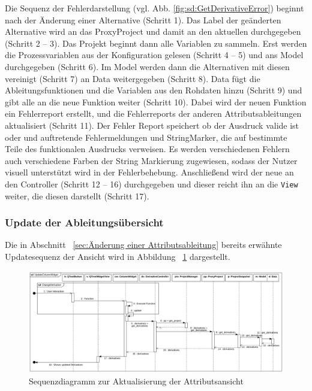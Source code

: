 \documentclass{article}
\newcommand{\classref}[1]{\texttt{\nameref{cls:#1}}}
\begin{document}
Die Sequenz der Fehlerdarstellung (vgl. Abb. \ref{fig:sd:GetDerivativeError}) beginnt nach der Änderung einer Alternative (Schritt 1). Das Label der geänderten Alternative wird an das ProxyProject und damit an den aktuellen \classref{ProjectSnaphot} durchgegeben (Schritt 2 -- 3). Das Projekt beginnt dann alle Variablen zu sammeln. Erst werden die Prozessvariablen aus der Konfiguration gelesen (Schritt 4 -- 5) und ans Model durchgegeben (Schritt 6). Im Model werden dann die Alternativen mit diesen vereinigt (Schritt 7) an Data weitergegeben (Schritt 8). Data fügt die Ableitungsfunktionen und die Variablen aus den Rohdaten hinzu (Schritt 9) und gibt alle an die neue Funktion weiter (Schritt 10). Dabei wird der neuen Funktion ein Fehlerreport erstellt, und die Fehlerreports der anderen Attributsableitungen aktualisiert (Schritt 11). Der Fehler Report speichert ob der Ausdruck valide ist oder und auftretende Fehlermeldungen und StringMarker, die auf bestimmte Teile des funktionalen Ausdrucks verweisen. Es werden verschiedenen Fehlern auch verschiedene Farben der String Markierung zugewiesen, sodass der Nutzer visuell unterstützt wird in der Fehlerbehebung. Anschließend wird der neue \classref{ErrorReport} an den Controller (Schritt 12 -- 16) durchgegeben und dieser reicht ihn an die \texttt{View} weiter, die diesen darstellt (Schritt 17).

\subsubsection{Update der Ableitungsübersicht}\label{sec:Update der Ableitungsübersicht}
Die in Abschnitt ~\ref{sec:Änderung einer Attributsableitung} bereits erwähnte Updatesequenz der Ansicht wird in Abbildung ~\ref{fig:sd:UpdateColumnWidgetSequenceDiagram} dargestellt.

\begin{figure}[H]%
    \centering
    \includegraphics[width=13cm]{entwurf/Floriane/UpdateColumnWidget.png}
    \caption{Sequenzdiagramm zur Aktualisierung der Attributsansicht}
    \label{fig:sd:UpdateColumnWidgetSequenceDiagram}
\end{figure}
\end{document}
